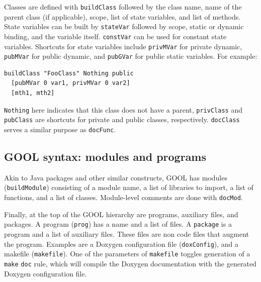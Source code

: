 \documentclass[sigplan,review,anonymous,prologue,dvipsnames]{acmart}
\newcommand{\Cplusplus}{C\texttt{++}}
\begin{document}
Classes are defined with \verb|buildClass| followed by the class name, name of
the parent class (if applicable), scope, list of state variables, and list of
methods. State variables can be built by \verb|stateVar| followed by scope, 
static or dynamic binding, and the variable itself.  \verb|constVar| can be 
used for constant state
variables. Shortcuts for state variables include \verb|privMVar| for private
dynamic, \verb|pubMVar| for public dynamic, and \verb|pubGVar| for public
static variables. For example:
\begin{lstlisting}
buildClass "FooClass" Nothing public
  [pubMVar 0 var1, privMVar 0 var2]
  [mth1, mth2]
\end{lstlisting}
\verb|Nothing| here indicates that this class does not have a parent,
\verb|privClass| and \verb|pubClass| are shortcuts for private and public
classes, respectively. \verb|docClass| serves a similar purpose as \verb|docFunc|.

\subsection{GOOL syntax: modules and programs}

Akin to Java packages and other similar constructs, GOOL has modules
(\verb|buildModule|) consisting of a module name, a list of libraries to import,
a list of functions, and a list of classes. Module-level comments are done
with \verb|docMod|.

Finally, at the top of the GOOL hierarchy are programs, auxiliary files, and
packages. A program (\verb|prog|) has a name and a list of files.  A
\verb|package| is a program and a list of auxiliary files. These files are non
code files that augment the program. Examples are a Doxygen configuration file
(\verb|doxConfig|), and a makefile (\verb|makefile|).  One of the parameters of
\verb|makefile| toggles generation of a \verb|make| \verb|doc| rule, which will
compile the Doxygen documentation with the generated Doxygen configuration
file.
\end{document}
